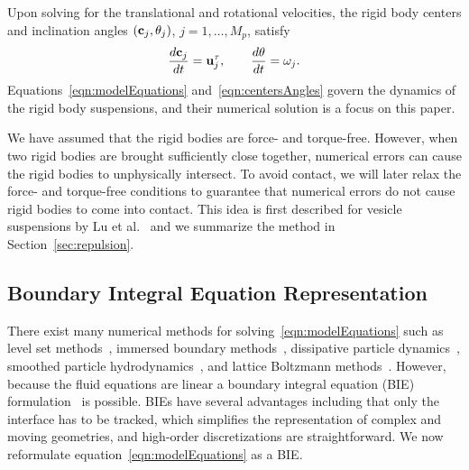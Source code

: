 \documentclass[preprint, 10pt]{elsarticle}
\begin{document}
Upon solving for the translational and rotational velocities, the rigid
body centers and inclination angles $({\mathbf{c}}_j,\theta_j)$,
$j=1,\ldots,M_p$, satisfy
\begin{align}
\begin{split}
  \frac{d{\mathbf{c}}_j}{dt} = {\mathbf{u}}^\tau_j, \qquad 
  \frac{d\theta}{dt} = \omega_j.
\end{split}
\label{eqn:centersAngles}
\end{align}
Equations~\eqref{eqn:modelEquations} and~\eqref{eqn:centersAngles} govern
the dynamics of the rigid body suspensions, and their numerical solution
is a focus on this paper.

We have assumed that the rigid bodies are force- and torque-free.
However, when two rigid bodies are brought sufficiently close together,
numerical errors can cause the rigid bodies to unphysically intersect.
To avoid contact,  we will later relax the force- and torque-free
conditions to guarantee that numerical errors do not cause rigid bodies
to come into contact.  This idea is first described for
vesicle suspensions by Lu et al.~\cite{Lu2017} and we summarize the
method in Section~\ref{sec:repulsion}.  


\subsection{Boundary Integral Equation Representation}
There exist many numerical methods for
solving~\eqref{eqn:modelEquations} such as level set
methods~\cite{Dou2007}, immersed boundary methods~\cite{Mittal2005},
dissipative particle dynamics~\cite{Pivkin2010}, smoothed particle
hydrodynamics~\cite{Polfer2016}, and lattice Boltzmann
methods~\cite{Ladd1994a, Ladd1994b}. However, because the fluid
equations are linear a boundary integral equation (BIE)
formulation~\cite{Pozrikidis1992} is possible.  BIEs have several
advantages including that only the interface has to be tracked, which
simplifies the representation of complex and moving geometries, and
high-order discretizations are straightforward.  We now reformulate
equation~\eqref{eqn:modelEquations} as a BIE.
\end{document}
